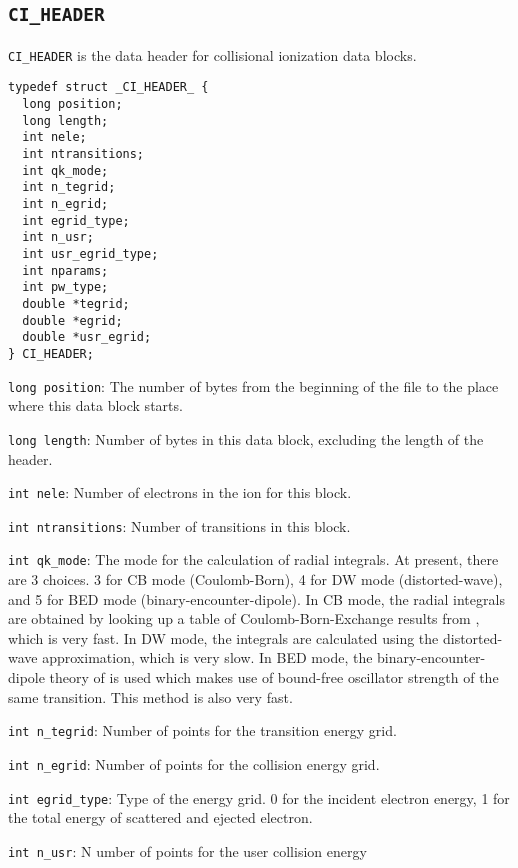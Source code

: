 \subsection{\texttt{CI\_HEADER}}
\texttt{CI\_HEADER} is the data header for collisional ionization data blocks.

\begin{verbatim}
typedef struct _CI_HEADER_ {
  long position;
  long length;
  int nele;
  int ntransitions;
  int qk_mode;
  int n_tegrid;
  int n_egrid;
  int egrid_type;
  int n_usr;
  int usr_egrid_type;
  int nparams;
  int pw_type;
  double *tegrid;
  double *egrid;
  double *usr_egrid;
} CI_HEADER;
\end{verbatim}

\begin{dbdesc}
\item[\texttt{long position}:] The number of bytes from the beginning of the
file to the place where this data block starts.
\item[\texttt{long length}:] Number of bytes in this data block, excluding the
length of the header.
\item[\texttt{int nele}:] Number of electrons in the ion for this block.
\item[\texttt{int ntransitions}:] Number of transitions in this block.
\item[\texttt{int qk\_mode}:] The mode for the calculation of radial
integrals. At present, there are 3 choices. 3 for CB mode (Coulomb-Born), 4 for
DW mode (distorted-wave), and 5 for BED mode (binary-encounter-dipole). In CB
mode, the radial integrals are obtained by looking up a table of
Coulomb-Born-Exchange results from \citet{golden:1977a,golden:1980a}, which is
very fast. In DW mode, the integrals are calculated using the distorted-wave
approximation, which is very slow. In BED mode, the binary-encounter-dipole
theory of \citet{kim:1994a} is used which makes use of bound-free oscillator
strength of the same transition. This method is also very fast.
\item[\texttt{int n\_tegrid}:] Number of points for the transition energy grid.
\item[\texttt{int n\_egrid}:] Number of points for the collision energy grid.
\item[\texttt{int egrid\_type}:] Type of the energy grid. 0 for the incident
electron energy, 1 for the total energy of scattered and ejected electron.
\item[\texttt{int n\_usr}:]N umber of points for the user collision energy

\end{dbdesc}
